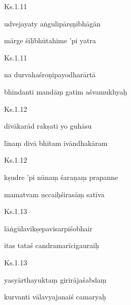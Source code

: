 \documentclass{tufte-handout}
\newenvironment{sanskrit}%
{\begin{otherlanguage}{sanskrit-devanagari}}%
{\end{otherlanguage}}
\begin{document}
    
	\begin{sanskrit}
	
	    
		Ks.1.11 
    
	    
		udvejayaty aṅgulipārṣṇibhāgān 
    
	    
		mārge śilībhūtahime 'pi yatra 
    
	\end{sanskrit}

    
	\begin{sanskrit}
	
	    
		Ks.1.11 
    
	    
		na durvahaśroṇipayodharārtā 
    
	    
		bhindanti mandāṃ gatim aśvamukhyaḥ 
    
	\end{sanskrit}

    
	\begin{sanskrit}
	
	    
		Ks.1.12 
    
	    
		divākarād rakṣati yo guhāsu 
    
	    
		līnaṃ divā bhītam ivāndhakāram 
    
	\end{sanskrit}

    
	\begin{sanskrit}
	
	    
		Ks.1.12 
    
	    
		kṣudre 'pi nūnaṃ śaraṇaṃ prapanne 
    
	    
		mamatvam uccaiḥśirasāṃ satīva 
    
	\end{sanskrit}

    
	\begin{sanskrit}
	
	    
		Ks.1.13 
    
	    
		lāṅgūlavikṣepavisarpiśobhair 
    
	    
		itas tataś candramarīcigauraiḥ 
    
	\end{sanskrit}

    
	\begin{sanskrit}
	
	    
		Ks.1.13 
    
	    
		yasyārthayuktaṃ girirājaśabdaṃ 
    
	    
		kurvanti vālavyajanaiś camaryaḥ 
    
	\end{sanskrit}
\end{document}
